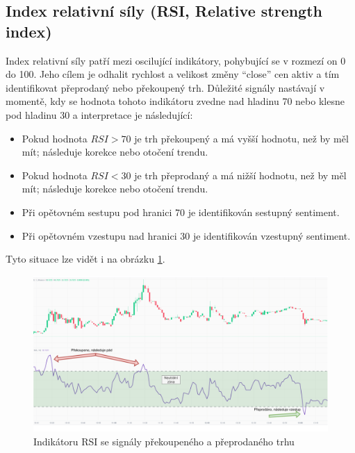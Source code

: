 \subsection{Index relativní síly (RSI, Relative strength index)}
Index relativní síly patří mezi oscilující indikátory, pohybující se v rozmezí on 0 do 100. Jeho cílem je odhalit rychlost a velikost změny \enquote{close} cen aktiv a tím identifikovat
přeprodaný nebo překoupený trh. Důležité signály nastávají v momentě, kdy se hodnota tohoto indikátoru zvedne nad hladinu 70 nebo klesne pod hladinu 30 a interpretace je následující:
\begin{itemize}
    \item Pokud hodnota $RSI > 70$ je trh překoupený a má vyšší hodnotu, než by měl mít; následuje korekce nebo otočení trendu.
    \item Pokud hodnota $RSI < 30$ je trh přeprodaný a má nižší hodnotu, než by měl mít; následuje korekce nebo otočení trendu.
    \item Při opětovném sestupu pod hranici 70 je identifikován sestupný sentiment.
    \item Při opětovném vzestupu nad hranici 30 je identifikován vzestupný sentiment.
\end{itemize}
Tyto situace lze vidět i na obrázku \ref{fig:rsi}.

\begin{figure}[h]
    \centering
    \includegraphics[width=1\textwidth]{Figures/RSI.pdf}
    \caption{Indikátoru RSI se signály překoupeného a přeprodaného trhu}
    \label{fig:rsi}
\end{figure}


